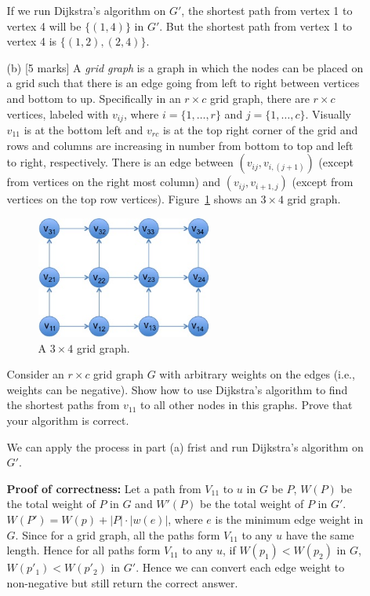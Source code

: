 \documentclass[11pt]{article}
\begin{document}
\begin{enumerate}
\begin{itemize}
If we run Dijkstra's algorithm on $G'$, the shortest path from vertex 1 to vertex 4 will be $\{(1, 4)\}$ 
in $G'$. But the shortest path from vertex 1 to vertex 4 is $\{(1, 2), (2, 4)\}$.

\newpage
\item[(b)] [5 marks] A {\em grid graph} is a graph in which the nodes can be placed on a grid such that there is an edge going from left to right between vertices and bottom to up. Specifically in an $r \times c$ grid graph, there are $r \times c$ vertices, labeled with $v_{ij}$, where $i=\{1,\ldots,r\}$ and $j=\{1,\ldots,c\}$. Visually $v_{11}$ is at the bottom left and $v_{rc}$ is at the top right corner of the grid and rows and columns are increasing in number from bottom to top and left to right, respectively. There is an edge between $(v_{ij},v_{i,(j+1)})$ (except from  vertices on the right most column) and $(v_{ij}, v_{i+1, j})$ (except from vertices on the top row vertices). Figure~\ref{fig:grid} shows an $3 \times 4$ grid graph.

\begin{figure}[h]
\centerline{\includegraphics[height=4cm]{grid-graph.jpg}}
\caption{A $3 \times 4$ grid graph.}\label{fig:grid}
\end{figure}


Consider an $r \times c$ grid graph $G$ with arbitrary weights on the edges (i.e., weights can be negative). Show how to use Dijkstra's algorithm to find the shortest paths from $v_{11}$ to all other nodes in this graphs. Prove that your algorithm is correct. 

We can apply the process in part (a) frist and run Dijkstra's algorithm on $G'$.

\textbf{Proof of correctness:} Let a path from $V_{11}$ to $u$ in $G$ be $P$, $W(P)$ be the total weight of 
$P$ in $G$ and $W'(P)$ be the total weight of $P$ in $G'$. $W(P') = W(p) + |P| \cdot |w(e)|$, where $e$ is the minimum edge 
weight in $G$. Since for a grid graph, all the paths form $V_{11}$ to any $u$ have the same length. Hence for all 
paths form $V_{11}$ to any $u$, if $W(p_1) < W(p_2)$ in $G$, $W(p'_1) < W(p'_2)$ in $G'$. Hence we can convert each 
edge weight to non-negative but still return the correct answer.


\end{itemize}
\end{enumerate}
\end{document}
